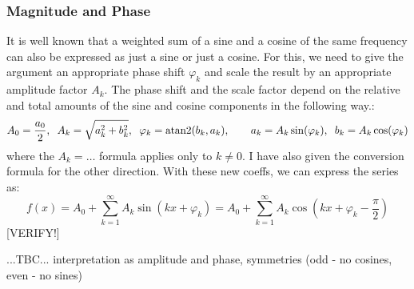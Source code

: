 \subsubsection{Magnitude and Phase}
It is well known that a weighted sum of a sine and a cosine of the same frequency can also be expressed as just a sine or just a cosine. For this, we need to give the argument an appropriate phase shift $\varphi_k$ and scale the result by an appropriate amplitude factor $A_k$. The phase shift and the scale factor depend on the relative and total amounts of the sine and cosine components in the following way.:
\begin{equation}
 A_0 = \frac{a_0}{2},           \;\;
 A_k = \sqrt{a_k^2 + b_k^2},    \;\;
 \varphi_k = \atan2(b_k, a_k),  \qquad
 a_k = A_k \sin(\varphi_k),     \;\;
 b_k = A_k \cos(\varphi_k)   
\end{equation}
where the $A_k = \ldots$ formula applies only to $k \neq 0$. I have also given the conversion formula for the other direction. With these new coeffs, we can express the series as:
\begin{equation}
f(x) = A_0 + \sum_{k=1}^\infty A_k \sin(k x +\varphi_k) 
     = A_0 + \sum_{k=1}^\infty A_k \cos(k x +\varphi_k - \frac{\pi}{2})
\end{equation}
[VERIFY!] 
\newline



\medskip
...TBC... interpretation as amplitude and phase, symmetries (odd - no cosines, even - no sines)

